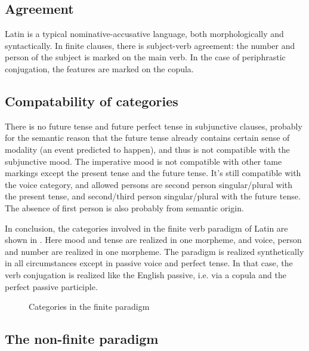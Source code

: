 \documentclass[a4paper, oneside, 12pt]{report}
\begin{document}
\subsection{Agreement}\label{sec:agreement-abs}

Latin is a typical nominative-accusative language,
both morphologically and syntactically.
In finite clauses, 
there is subject-verb agreement:
the number and person of the subject is marked on the main verb.
In the case of periphrastic conjugation,
the features are marked on the copula.

\subsection{Compatability of categories}

There is no \acl{future} tense and \acl{future perfect} tense in subjunctive clauses,
probably for the semantic reason
that the future tense already contains certain sense of modality
(an event predicted to happen),
and thus is not compatible with the \acl{subjunctive} mood.
The \acl{imperative} mood is not compatible with other \ac{tame} markings
except the \acl{present} tense and the \acl{future} tense.
It's still compatible with the voice category,
and allowed persons are 
second person singular/plural with the \acl{present} tense,
and second/third person singular/plural with the \acl{future} tense.
The absence of first person is also probably from semantic origin.

In conclusion, the categories involved in the finite verb paradigm of Latin 
are shown in .
Here mood and tense are realized in one morpheme,
and voice, person and number are realized in one morpheme.
The paradigm is realized synthetically in all circumstances 
except in passive voice and perfect tense.
In that case, the verb conjugation is realized like the English passive,
i.e. via a copula and the perfect passive participle.

\begin{figure}[H]
    \centering
    
    \caption{Categories in the finite paradigm}
    \label{fig:paradigm-finite-verb}
\end{figure}


\subsection{The non-finite paradigm}\label{sec:non-finite-abs}
\end{document}
